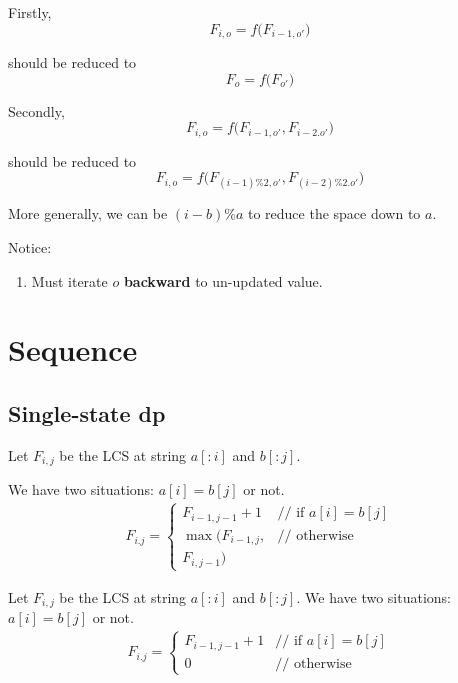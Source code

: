 Firstly,
$$
F_{i, o} = f\big(F_{i-1, o'}\big)
$$

should be reduced to 
$$
F_{o} = f\big(F_{o'}\big)
$$

Secondly,
$$
F_{i, o} = f\big(F_{i-1, o'}, F_{i-2. o'}\big)
$$

should be reduced to 
$$
F_{i, o} = f\big(F_{(i-1)\%2, o'}, F_{(i-2)\%2. o'}\big)
$$

More generally, we can be $(i-b)\%a$ to reduce the space down to $a$.

Notice:
\begin{enumerate}
\item Must iterate $o$ \textbf{backward} to un-updated value. 
\end{enumerate}



\section{Sequence}\label{dpSequence}

\subsection{Single-state dp}
 Let $F_{i, j}$ be the LCS at string $a[:i]$ and $b[:j]$. 

We have two situations: $a[i]=b[j]$ or not.
\begin{eqnarray*}
F_{i. j} = \left\{ \begin{array}{rl}
  F_{i-1, j-1}+1 &\mbox{// if $a[i]=b[j]$} \\
  \max\Big(F_{i-1, j}, &\mbox{// otherwise} \\
  F_{i,j-1}\Big)
       \end{array} \right.
\end{eqnarray*}


 Let $F_{i, j}$ be the LCS at string $a[:i]$ and
$b[:j]$. We have two situations: $a[i]=b[j]$ or not.
\begin{eqnarray*}
F_{i. j} = \left\{ \begin{array}{rl}
  F_{i-1, j-1}+1 &\mbox{// if $a[i]=b[j]$} \\
  0 &\mbox{// otherwise}
       \end{array} \right.
\end{eqnarray*}

